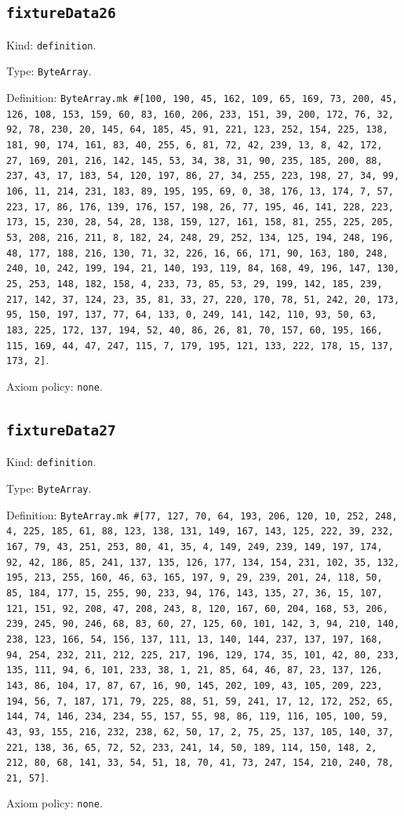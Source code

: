 \documentclass[11pt]{article}
\begin{document}
\subsection*{\texttt{fixtureData26}}
\noindent Kind: \texttt{definition}.\par
\noindent Type: \texttt{ByteArray}.\par
\noindent Definition: \texttt{ByteArray.mk \#[100, 190, 45, 162, 109, 65, 169, 73, 200, 45, 126, 108, 153, 159, 60, 83, 160, 206, 233, 151, 39, 200, 172, 76, 32, 92, 78, 230, 20, 145, 64, 185, 45, 91, 221, 123, 252, 154, 225, 138, 181, 90, 174, 161, 83, 40, 255, 6, 81, 72, 42, 239, 13, 8, 42, 172, 27, 169, 201, 216, 142, 145, 53, 34, 38, 31, 90, 235, 185, 200, 88, 237, 43, 17, 183, 54, 120, 197, 86, 27, 34, 255, 223, 198, 27, 34, 99, 106, 11, 214, 231, 183, 89, 195, 195, 69, 0, 38, 176, 13, 174, 7, 57, 223, 17, 86, 176, 139, 176, 157, 198, 26, 77, 195, 46, 141, 228, 223, 173, 15, 230, 28, 54, 28, 138, 159, 127, 161, 158, 81, 255, 225, 205, 53, 208, 216, 211, 8, 182, 24, 248, 29, 252, 134, 125, 194, 248, 196, 48, 177, 188, 216, 130, 71, 32, 226, 16, 66, 171, 90, 163, 180, 248, 240, 10, 242, 199, 194, 21, 140, 193, 119, 84, 168, 49, 196, 147, 130, 25, 253, 148, 182, 158, 4, 233, 73, 85, 53, 29, 199, 142, 185, 239, 217, 142, 37, 124, 23, 35, 81, 33, 27, 220, 170, 78, 51, 242, 20, 173, 95, 150, 197, 137, 77, 64, 133, 0, 249, 141, 142, 110, 93, 50, 63, 183, 225, 172, 137, 194, 52, 40, 86, 26, 81, 70, 157, 60, 195, 166, 115, 169, 44, 47, 247, 115, 7, 179, 195, 121, 133, 222, 178, 15, 137, 173, 2]}.\par
\noindent Axiom policy: \texttt{none}.\par
\subsection*{\texttt{fixtureData27}}
\noindent Kind: \texttt{definition}.\par
\noindent Type: \texttt{ByteArray}.\par
\noindent Definition: \texttt{ByteArray.mk \#[77, 127, 70, 64, 193, 206, 120, 10, 252, 248, 4, 225, 185, 61, 88, 123, 138, 131, 149, 167, 143, 125, 222, 39, 232, 167, 79, 43, 251, 253, 80, 41, 35, 4, 149, 249, 239, 149, 197, 174, 92, 42, 186, 85, 241, 137, 135, 126, 177, 134, 154, 231, 102, 35, 132, 195, 213, 255, 160, 46, 63, 165, 197, 9, 29, 239, 201, 24, 118, 50, 85, 184, 177, 15, 255, 90, 233, 94, 176, 143, 135, 27, 36, 15, 107, 121, 151, 92, 208, 47, 208, 243, 8, 120, 167, 60, 204, 168, 53, 206, 239, 245, 90, 246, 68, 83, 60, 27, 125, 60, 101, 142, 3, 94, 210, 140, 238, 123, 166, 54, 156, 137, 111, 13, 140, 144, 237, 137, 197, 168, 94, 254, 232, 211, 212, 225, 217, 196, 129, 174, 35, 101, 42, 80, 233, 135, 111, 94, 6, 101, 233, 38, 1, 21, 85, 64, 46, 87, 23, 137, 126, 143, 86, 104, 17, 87, 67, 16, 90, 145, 202, 109, 43, 105, 209, 223, 194, 56, 7, 187, 171, 79, 225, 88, 51, 59, 241, 17, 12, 172, 252, 65, 144, 74, 146, 234, 234, 55, 157, 55, 98, 86, 119, 116, 105, 100, 59, 43, 93, 155, 216, 232, 238, 62, 50, 17, 2, 75, 25, 137, 105, 140, 37, 221, 138, 36, 65, 72, 52, 233, 241, 14, 50, 189, 114, 150, 148, 2, 212, 80, 68, 141, 33, 54, 51, 18, 70, 41, 73, 247, 154, 210, 240, 78, 21, 57]}.\par
\noindent Axiom policy: \texttt{none}.\par
\end{document}
